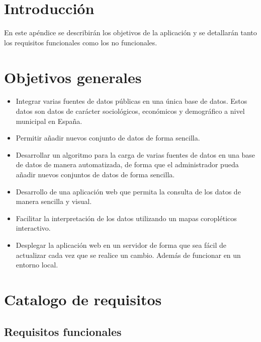 
\section{Introducción}

En este apéndice se describirán los objetivos de la aplicación y se detallarán tanto los requisitos funcionales como los no funcionales.

\section{Objetivos generales}

\begin{itemize}
	\item Integrar varias fuentes de datos públicas en una única base de datos. Estos datos son datos de carácter sociológicos, económicos y demográfico a nivel municipal en España.
	\item Permitir añadir nuevos conjunto de datos de forma sencilla.
	\item Desarrollar un algoritmo para la carga de varias fuentes de datos en una base de datos de manera automatizada, de forma que el administrador pueda añadir nuevos conjuntos de datos de forma sencilla.
	\item Desarrollo de una aplicación web que permita la consulta de los datos de manera sencilla y visual.
	\item Facilitar la interpretación de los datos utilizando un mapas coropléticos interactivo.
	\item Desplegar la aplicación web en un servidor de forma que sea fácil de actualizar cada vez que se realice un cambio. Además de funcionar en un entorno local.
\end{itemize}

\section{Catalogo de requisitos}

\subsection{Requisitos funcionales}

